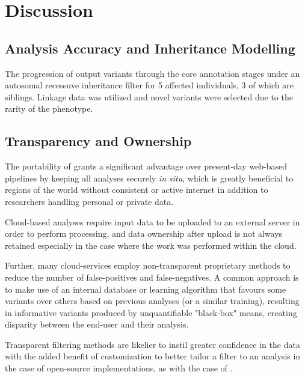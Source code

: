 \section{Discussion}

\subsection{Analysis Accuracy and Inheritance Modelling}


{The progression of output variants through the core annotation stages under an autosomal recessuve inheritance filter for 5 affected individuals, 3 of which are siblings. Linkage data was utilized and novel variants were selected due to the rarity of the phenotype.}


\subsection{Transparency and Ownership}

The portability of \app grants a significant advantage over present-day web-based pipelines by keeping all analyses securely \textit{in situ}, which is greatly beneficial to regions of the world without consistent or active internet in addition to researchers handling personal or private data.

Cloud-based analyses require input data to be uploaded to an external server in order to perform processing, and data ownership after upload is not always retained especially in the case where the work was performed within the cloud.

Further, many cloud-services employ non-transparent proprietary methods to reduce the number of false-positives and false-negatives. A common approach is to make use of an internal database or learning algorithm that favours some variants over others based on previous analyses (or a similar training), resulting in informative variants produced by unquantifiable "black-box" means, creating disparity between the end-user and their analysis.

Transparent filtering methods are likelier to instil greater confidence in the data with the added benefit of customization to better tailor a filter to an analysis in the case of open-source implementations, as with the case of \app.
